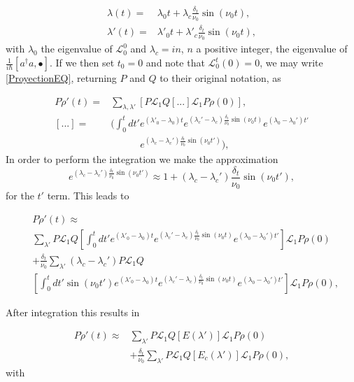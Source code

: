 \documentclass[reprint, amsmath,amssymb, aps,pra]{revtex4-1}
\begin{document}
\begin{align}
\lambda(t) =& \lambda_0 t + \lambda_c\frac{\delta_t}{\nu_0}\sin(\nu_0 t),\\
\lambda'(t) =& \lambda'_0 t + \lambda'_c\frac{\delta_t}{\nu_0}\sin(\nu_0 t),
\end{align} 
with $\lambda_0$ the eigenvalue of $\mathcal{L}_0^0$ and
$\lambda_c=i n$, $n$ a positive integer, the eigenvalue of
$\frac{1}{i\hbar}[a^\dagger a,\bullet]$. If we then set $t_0=0$ and note that
$\mathcal{L}_0^t(0)=0$, we may write \eqref{ProyectionEQ}, returning
$P$ and $Q$ to their original notation, as

\begin{align}
P\dot{\rho}'(t)=&\sum_{\lambda,\lambda'}[P \mathcal{L}_1Q[...]\mathcal{L}_1P\rho(0)],\\
[...] =& (\int_0^t dt' e^{(\lambda'_0-\lambda_0)t}e^{(\lambda_c'-\lambda_c)\frac{\delta_t}{\nu_0} \sin(\nu_0t)}e^{(\lambda_0-\lambda_0')t'}\nonumber \\ 
&\qquad \quad e^{(\lambda_c-\lambda_c')\frac{\delta_t}{\nu_0} \sin(\nu_0t')}),\nonumber
\end{align} In order to perform the integration we make the approximation
\begin{equation}
e^{(\lambda_c-\lambda_c')\frac{\delta_t}{\nu_0} \sin(\nu_0t')} \approx 1+(\lambda_c-\lambda_c')\frac{\delta_t}{\nu_0} \sin(\nu_0t'),
\end{equation} for the $t'$ term. This leads to

\begin{align}
&P\dot{\rho}'(t)\approx \\
&\sum_{\lambda'}P \mathcal{L}_1Q[\int_0^t dt' e^{(\lambda'_0-\lambda_0)t}e^{(\lambda_c'-\lambda_c)\frac{\delta_t}{\nu_0} \sin(\nu_0t)}e^{(\lambda_0-\lambda_0')t'}]\mathcal{L}_1P\rho(0)\nonumber \\
&+\frac{\delta_t}{\nu_0}\sum_{\lambda'}(\lambda_c-\lambda_c')P\mathcal{L}_1Q \nonumber\\
&[\int_0^t dt'\sin(\nu_0t') e^{(\lambda'_0-\lambda_0)t}e^{(\lambda_c'-\lambda_c)\frac{\delta_t}{\nu_0} \sin(\nu_0t)}e^{(\lambda_0-\lambda_0')t'}]\mathcal{L}_1P\rho(0),\nonumber
\end{align}

 After integration this results in

\begin{align}
P\dot{\rho}'(t)\approx& \sum_{\lambda'}P \mathcal{L}_1Q[E(\lambda')]\mathcal{L}_1P\rho(0)\\
&+\frac{\delta_t}{\nu_0}\sum_{\lambda'}P\mathcal{L}_1Q[E_c(\lambda')]\mathcal{L}_1P\rho(0),\nonumber
\end{align}  with
\end{document}
